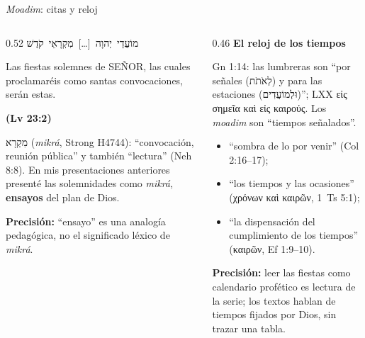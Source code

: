 \documentclass[hyperref={bookmarks=false},aspectratio=169]{beamer}
\newcommand{\heb}[1]{\mbox{\foreignlanguage{hebrew}{#1}}}
\newcommand{\grc}[1]{\foreignlanguage{ancientgreek}{#1}}
\newcommand{\SENOR}{S{\fontsize{0.78em}{1em}\selectfont EÑOR}}
\newcommand{\fuente}[1]{\par\hfill{\upshape\bfseries\footnotesize\textcolor{tierraroja}{#1}}}
\newcommand{\destacar}[1]{\textbf{\textcolor{tierraroja}{#1}}}
\newcommand{\precision}[1]{{\footnotesize\color{sepia}\textbf{Precisión:} #1}}
\begin{document}
\begin{frame}{\emph{Moadim}: citas y reloj}
\begin{columns}[t,onlytextwidth]
\begin{column}{0.52\textwidth}
\centering\small\heb{מוֹעֲדֵי יְהוָה}\ \foreignlanguage{spanish}{[\ldots]}\ \heb{מִקְרָאֵי קֹדֶשׁ}
\begin{cita}Las fiestas solemnes de \SENOR, las cuales proclamaréis como santas convocaciones, serán estas.\fuente{(Lv 23:2)}\end{cita}
\scriptsize\RaggedRight \heb{מִקְרָא} (\emph{mikrá}, Strong H4744): ``convocación, reunión pública'' y también ``lectura'' (Neh 8:8). En mis presentaciones anteriores presenté las solemnidades como \emph{mikrá}, \destacar{ensayos} del plan de Dios.\par\smallskip
\precision{``ensayo'' es una analogía pedagógica, no el significado léxico de \emph{mikrá}.}
\end{column}
\begin{column}{0.46\textwidth}\scriptsize\RaggedRight
\textbf{\small\textcolor{tierraroja}{El reloj de los tiempos}}\par\smallskip
Gn 1:14: las lumbreras son ``por señales (\heb{לְאֹתֹת}) y para las estaciones (\heb{וּלְמוֹעֲדִים})''; LXX \grc{εἰς σημεῖα καὶ εἰς καιρούς}. Los \emph{moadim} son ``tiempos señalados''.
\begin{itemize}\scriptsize
\item ``sombra de lo por venir'' (Col 2:16--17);
\item ``los tiempos y las ocasiones'' (\grc{χρόνων καὶ καιρῶν}, 1~Ts 5:1);
\item ``la dispensación del cumplimiento de los tiempos'' (\grc{καιρῶν}, Ef 1:9--10).
\end{itemize}
\precision{leer las fiestas como calendario profético es lectura de la serie; los textos hablan de tiempos fijados por Dios, sin trazar una tabla.}
\end{column}
\end{columns}
\end{frame}
\end{document}
